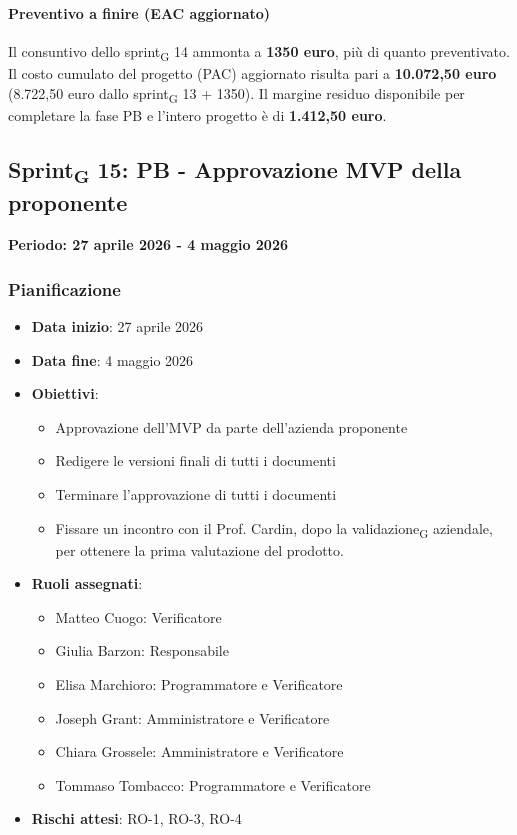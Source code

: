 \documentclass[11pt,a4paper]{article}
\newcommand{\gls}[1]{#1\textsubscript{G}}
\begin{document}
\paragraph{Preventivo a finire (EAC aggiornato)}
Il consuntivo dello \gls{sprint} 14 ammonta a \textbf{1350 euro}, più di quanto preventivato.
Il costo cumulato del progetto (PAC) aggiornato risulta pari a \textbf{10.072,50 euro} (8.722,50 euro dallo \gls{sprint} 13 + 1350). 
Il margine residuo disponibile per completare la fase PB e l'intero progetto è di \textbf{1.412,50 euro}.

\newpage
\subsection{\gls{Sprint} 15: PB - Approvazione MVP della proponente}
{\textbf{Periodo: 27 aprile 2026 - 4 maggio 2026}\par}

\subsubsection{Pianificazione}
\begin{itemize}
    \item \textbf{Data inizio}: 27 aprile 2026
    \item \textbf{Data fine}: 4 maggio 2026
    \item \textbf{Obiettivi}:
    \begin{itemize}
        \item Approvazione dell'MVP da parte dell'azienda proponente
        \item Redigere le versioni finali di tutti i documenti
        \item Terminare l'approvazione di tutti i documenti
        \item Fissare un incontro con il Prof. Cardin, dopo la \gls{validazione} aziendale, per ottenere la prima valutazione del prodotto.
    \end{itemize}
    
    \item \textbf{Ruoli assegnati}:
    \begin{itemize}
        \item Matteo Cuogo: Verificatore
        \item Giulia Barzon: Responsabile
        \item Elisa Marchioro: Programmatore e Verificatore
        \item Joseph Grant: Amministratore e Verificatore
        \item Chiara Grossele: Amministratore e Verificatore
        \item Tommaso Tombacco: Programmatore e Verificatore
    \end{itemize}
    \item \textbf{Rischi attesi}: RO-1, RO-3, RO-4
\end{itemize}
\end{document}
